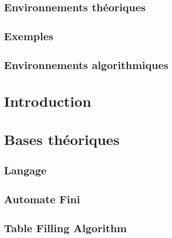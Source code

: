 

\newcommand{\student}{Benjamin André}
\newcommand{\grade}{MAB2 Sciences Informatiques}
\newcommand{\director}{Véronique Bruyère}
\renewcommand{\title}{Vérification de la sécurité d'automates à file par apprentissage actif}
\renewcommand{\date}{\today}



	

	\tableofcontents
	\newpage

	\section*{Environnements théoriques}

	\section*{Exemples}

	\section*{Environnements algorithmiques}

	\newpage

	\chapter{Introduction}\label{ch:intro}
	\chapter{Bases théoriques}\label{ch:bases}
	\section{Langage}\label{sec:langage}
	\section{Automate Fini}\label{sec:automaton}
	\section{Table Filling Algorithm}\label{sec:tfa}
